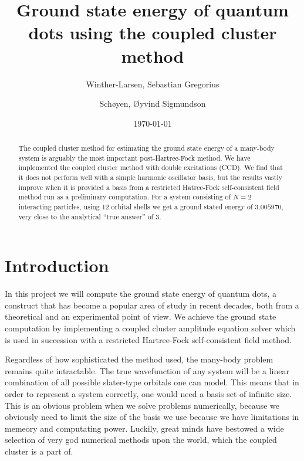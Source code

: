 \documentclass[
    a4paper, aps, twocolumn, floatfix, superscriptaddress,
    nofootinbib]{revtex4-1}
\newcommand{\1}{\mathds{1}}
\begin{document}
\title{Ground state energy of quantum dots using the coupled cluster method}
\author{Winther-Larsen, Sebastian Gregorius}
\author{Schøyen, Øyvind Sigmundson}
\date{\today}

\begin{abstract}
    The coupled cluster method for estimating the ground state energy of a many-body
    system is arguably the most important post-Hartree-Fock method. We have implemented
    the coupled cluster method with double excitations (CCD). We find that it does not
    perform well with a simple harmonic oscillator basis, but the results vastly improve 
    when it is provided a basis from a restricted Hatree-Fock self-consistent field method
    run as a preliminary computation. For a system consisting of $N=2$ interacting
    particles, using 12 orbital shells we get a ground stated energy of $3.005970$, very
    close to the analytical ``true answer'' of $3$\cite{taut1994two}. 
\end{abstract}

\maketitle
\tableofcontents


\section{Introduction}
    In this project we will compute the ground state energy of quantum dots, a
    construct that has become a popular area of study in recent decades, both from
    a theoretical and an experimental point of view. We achieve the ground state
    computation by implementing a coupled cluster amplitude equation solver
    which is used in succession with a restricted Hartree-Fock self-consistent
    field method. 
    
    Regardless of how sophisticated the method used, the many-body problem remains
    quite intractable. The true wavefunction of any system will be a linear 
    combination of all possible slater-type orbitals one can model. This means that
    in order to represent a system correctly, one would need a basis set of infinite
    size. This is an obvious problem when we solve problems numerically, because we
    obviously need to limit the size of the basis we use because we have limitations
    in memeory and computating power. Luckily, great minds have bestowed a wide 
    selection of very god numerical methods upon the world, which the coupled cluster
    is a part of. 
\end{document}
